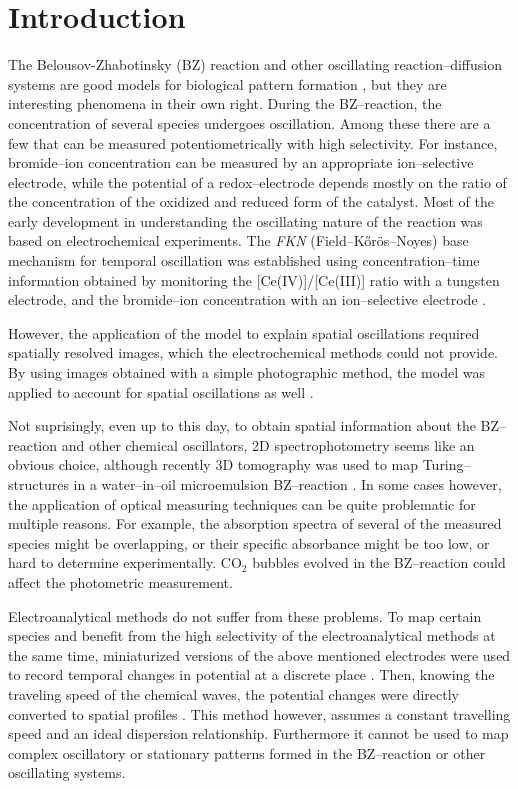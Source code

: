 \documentclass[3p]{elsarticle}
\begin{document}
\section{Introduction}
The Belousov-Zhabotinsky (BZ) reaction and other oscillating reaction--diffusion systems are good models for biological pattern formation \cite{kondo2010reaction}, but they are interesting phenomena in their own right.
During the BZ--reaction, the concentration of several species undergoes oscillation.
Among these there are a few that can be measured potentiometrically with high selectivity.
For instance, bromide--ion concentration can be measured by an appropriate ion--selective electrode, while the potential of a redox--electrode depends mostly on the ratio of the concentration of the oxidized and reduced form of the catalyst.
Most of the early development in understanding the oscillating nature of the reaction was based on electrochemical experiments.
The \emph{FKN} (Field--Kőrös--Noyes) base mechanism for temporal oscillation was established using concentration--time information obtained by monitoring the [Ce(IV)]/[Ce(III)] ratio with a tungsten electrode, and the bromide--ion concentration with an ion--selective electrode \cite{noyes1972oscillations, field1972oscillations, field1974oscillationsIV}.

However, the application of the model to explain spatial oscillations required spatially resolved images, which the electrochemical methods could not provide.
By using images obtained with a simple photographic method, the model was applied to account for spatial oscillations as well \cite{field1974oscillationsV}.

Not suprisingly, even up to this day, to obtain spatial information about the BZ--reaction and other chemical oscillators, 2D spectrophotometry seems like an obvious choice, although recently 3D tomography was used to map Turing--structures in a water--in--oil microemulsion BZ--reaction \cite{bansagi2011tomography}. In some cases however, the application of optical measuring techniques can be quite problematic for multiple reasons.
For example, the absorption spectra of several of the measured species might be overlapping, or their specific absorbance might be too low, or hard to determine experimentally.
CO$_2$ bubbles evolved in the BZ--reaction could affect the photometric measurement.

Electroanalytical methods do not suffer from these problems.
To map certain species and benefit from the high selectivity of the electroanalytical methods at the same time, miniaturized versions of the above mentioned electrodes were used to record temporal changes in potential at a discrete place \cite{nagy1990electrochemical}.
Then, knowing the traveling speed of the chemical waves, the potential changes were directly converted to spatial profiles \cite{nagy1991control}.
This method however, assumes a constant travelling speed and an ideal dispersion relationship.
Furthermore it cannot be used to map complex oscillatory or stationary patterns formed in the BZ--reaction or other oscillating systems.
\end{document}
